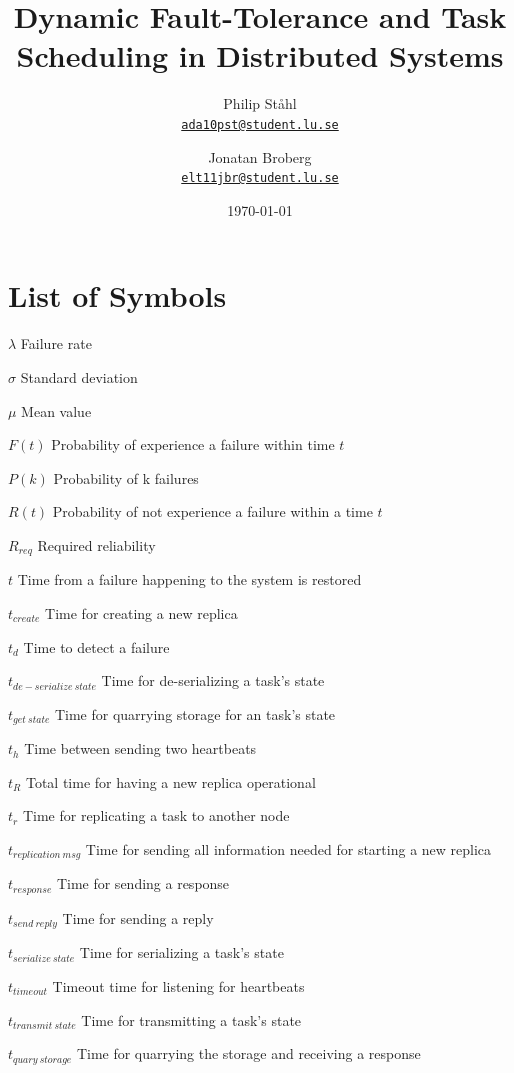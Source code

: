 \documentclass{cslthse-msc}
\author{
	Philip Ståhl \\
	{\normalsize \href{mailto:ada10pst@student.lu.se}{\texttt{ada10pst@student.lu.se}}}
	\and
	Jonatan Broberg \\
    {\normalsize \href{mailto:elt11jbr@student.lu.se}{\texttt{elt11jbr@student.lu.se}}}
}
\title{Dynamic Fault-Tolerance and Task Scheduling in Distributed Systems}
\subtitle{}
\date{\today}
\newcommand{\loslabel}[1]{\makebox[3cm][l]{\textbf{#1}\ }}
\newenvironment{listofsymbols}{\begin{list}{}{\renewcommand{\makelabel}{\loslabel}}}{\end{list}}
\begin{document}
\makefrontmatter

\listoffigures
\listoftables

\chapter*{List of Symbols}
\begin{listofsymbols}
\item[$\lambda$] Failure rate
\item[$\sigma$] Standard deviation
\item[$\mu$] Mean value
\item[$F(t)$] Probability of experience a failure within time $t$
\item[$P(k)$] Probability of k failures
\item[$R(t)$] Probability of not experience a failure within a time $t$
\item[$R_{req}$] Required reliability
\item[$t$] Time from a failure happening to the system is restored
\item[$t_{create}$] Time for creating a new replica
\item[$t_d$] Time to detect a failure
\item[$t_{de-serialize\ state}$] Time for de-serializing a task's state
\item[$t_{get\ state}$] Time for quarrying storage for an task's state 
\item[$t_h$] Time between sending two heartbeats
\item[$t_R$] Total time for having a new replica operational
\item[$t_{r}$] Time for replicating a task to another node
\item[$t_{replication\ msg}$] Time for sending all information needed for starting a new replica
\item[$t_{response}$] Time for sending a response
\item[$t_{send\ reply}$] Time for sending a reply
\item[$t_{serialize\ state}$] Time for serializing a task's state
\item[$t_{timeout}$] Timeout time for listening for heartbeats
\item[$t_{transmit\ state}$] Time for transmitting a task's state
\item[$t_{quary\ storage}$] Time for quarrying the storage and receiving a response
\end{listofsymbols}
\end{document}
